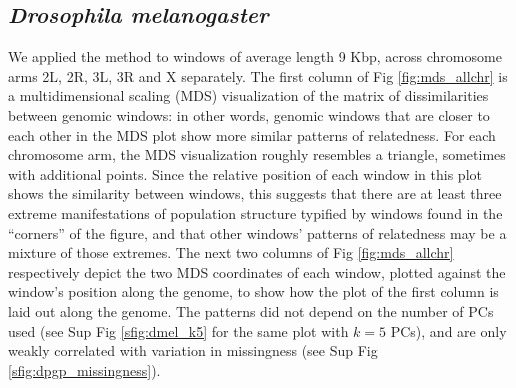 \documentclass[11pt, oneside]{article}   	%
\newcommand{\Figure}{Fig }
\newcommand{\SFigure}{Sup Fig }
\newcommand{\Figure}{{Figure }}
\newcommand{\SFigure}{{Supplementary Figure }}
\renewcommand{\revpoint}[2]{\relax}
\begin{document}
\subsection{\textit{Drosophila melanogaster}}

We applied the method to windows of average length 9 Kbp, across chromosome arms 2L, 2R, 3L, 3R and X separately.
The first column of \Figure \ref{fig:mds_allchr} is a multidimensional scaling (MDS) visualization 
of the matrix of dissimilarities between genomic windows:
in other words, genomic windows that are closer to each other in the MDS plot show more similar patterns of relatedness.
For each chromosome arm, the MDS visualization roughly resembles a triangle,
sometimes with additional points.
Since the relative position of each window in this plot shows the similarity between windows, 
this suggests that there are at least three extreme manifestations of population structure 
typified by windows found in the ``corners'' of the figure,
and that other windows' patterns of relatedness may be a mixture of those extremes. 
The next two columns of \Figure \ref{fig:mds_allchr} respectively depict the two MDS coordinates of each window,
plotted against the window's position along the genome,
to show how the plot of the first column is laid out along the genome.
The patterns did not depend on the number of PCs used
(see \SFigure \ref{sfig:dmel_k5} for the same plot with $k=5$ PCs), %
and are only weakly correlated with variation in missingness 
(see \SFigure \ref{sfig:dpgp_missingness}). %
\end{document}
